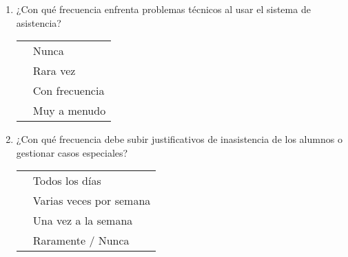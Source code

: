 \documentclass[12pt, a4paper]{article}
\newcommand{\checkbox}{\fbox{\rule{0pt}{1.5ex}\rule{1.5ex}{0pt}}}
\begin{document}
\begin{enumerate}[label=\textbf{B\arabic*}.]
                                                                                                                                        \item ¿Con qué frecuencia enfrenta problemas técnicos al usar el sistema de asistencia?\\
                                                                                                                                            \begin{tabular}{ll}
                                                                                                                                            \checkbox & Nunca \\
                                                                                                                                                \checkbox & Rara vez \\
                                                                                                                                                \checkbox & Con frecuencia \\
                                                                                                                                                \checkbox & Muy a menudo \\
                                                                                                                                                \end{tabular}

                                                                                                                                                \item ¿Con qué frecuencia debe subir justificativos de inasistencia de los alumnos o gestionar casos especiales?\\
                                                                                                                                                    \begin{tabular}{ll}
                                                                                                                                                    \checkbox & Todos los días \\
                                                                                                                                                        \checkbox & Varias veces por semana \\
                                                                                                                                                        \checkbox & Una vez a la semana \\
                                                                                                                                                        \checkbox & Raramente / Nunca \\
                                                                                                                                                        \end{tabular}


\end{enumerate}
\end{document}
